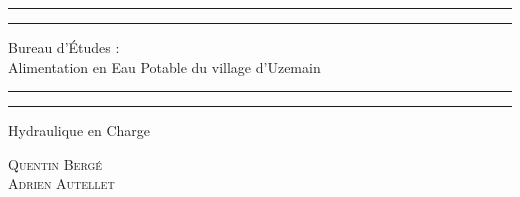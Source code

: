 \documentclass[a4paper,oneside]{article}
\begin{document}


\begin{titlepage} %

	\centering %

	\scshape %

	\vspace*{\baselineskip} %


	\rule{\textwidth}{1.6pt}\vspace*{-\baselineskip}\vspace*{2pt}
	\rule{\textwidth}{0.4pt} %

	\vspace{0.75\baselineskip} %

	{\LARGE Bureau d'\'Etudes :\\
	\vspace{0.75\baselineskip}
	Alimentation en Eau Potable du village d'Uzemain \\
	} %

	\vspace{1\baselineskip} %
	\rule{\textwidth}{0.4pt}\vspace*{-\baselineskip}\vspace*{3.2pt}
	\rule{\textwidth}{1.6pt} %
	\vspace{2\baselineskip} %


	Hydraulique en Charge

	\vspace*{3\baselineskip} %



	\vspace{0.5\baselineskip} %

	{\scshape\Large Quentin Bergé \\ Adrien Autellet\\} %


\end{titlepage}
\end{document}
